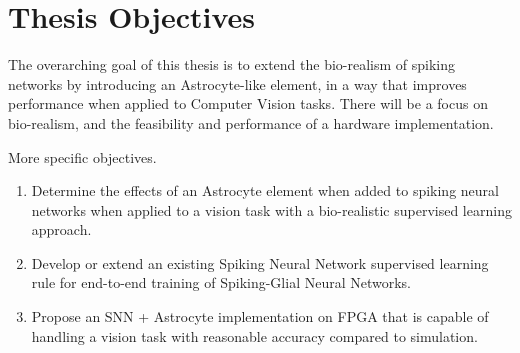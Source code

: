     \section{Thesis Objectives}
    The overarching goal of this thesis is to extend the bio-realism of spiking networks by introducing an Astrocyte-like element, in a way that improves performance when applied to Computer Vision tasks. There will be a focus on bio-realism, and the feasibility and performance of a hardware implementation.

    More specific objectives.
    \begin{enumerate}
        \item Determine the effects of an Astrocyte element when added to spiking neural networks when applied to a vision task with a bio-realistic supervised learning approach.
        \item Develop or extend an existing Spiking Neural Network supervised learning rule for end-to-end training of Spiking-Glial Neural Networks.
        \item Propose an SNN + Astrocyte implementation on FPGA that is capable of handling a vision task with reasonable accuracy compared to simulation.
    \end{enumerate}
